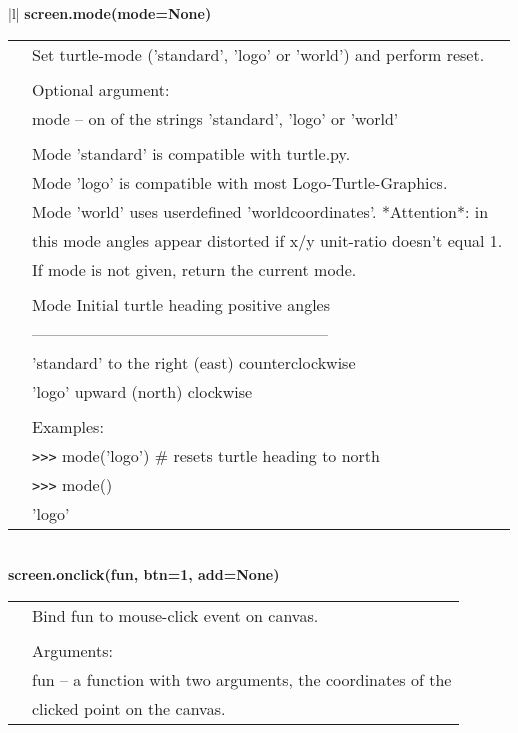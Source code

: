 \begin{center}
{\begin{tabular}{|l|}
{\bf    screen.mode(mode=None)} \\
   \begin{tabular}{p{0.25in}p{4in}}
&        Set turtle-mode ('standard', 'logo' or 'world') and perform reset. \\
&  \\
&        Optional argument: \\
&        mode -- on of the strings 'standard', 'logo' or 'world' \\
&  \\
&        Mode 'standard' is compatible with turtle.py. \\
&        Mode 'logo' is compatible with most Logo-Turtle-Graphics. \\
&        Mode 'world' uses userdefined 'worldcoordinates'. *Attention*: in \\
&        this mode angles appear distorted if x/y unit-ratio doesn't equal 1. \\
&        If mode is not given, return the current mode. \\
&  \\
&             Mode      Initial turtle heading     positive angles \\
&         -------------------------------------------------------- \\
&          'standard'    to the right (east)       counterclockwise \\
&            'logo'        upward    (north)         clockwise \\
&  \\
&        Examples: \\
&        \verb+>+\verb+>+\verb+>+ mode('logo')   \# resets turtle heading to north \\
&        \verb+>+\verb+>+\verb+>+ mode() \\
&        'logo' \\
\end{tabular} \\ \hline
{\bf    screen.onclick(fun, btn=1, add=None)} \\
   \begin{tabular}{p{0.25in}p{4in}}
&        Bind fun to mouse-click event on canvas. \\
&  \\
&        Arguments: \\
&        fun -- a function with two arguments, the coordinates of the \\
&               clicked point on the canvas. \\

\end{tabular}
\end{tabular}}
\end{center}
